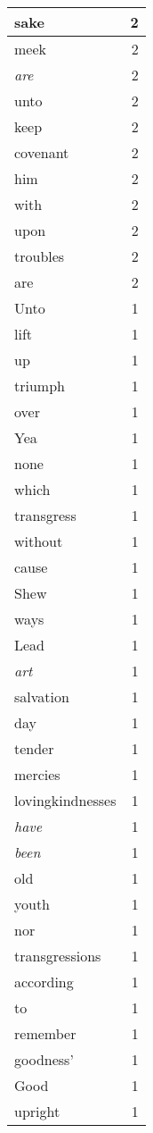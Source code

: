 \begin{center}
\begin{longtable}{l|r}
sake & 2 \\ \hline
meek & 2 \\ \hline
\emph{are} & 2 \\ \hline
unto & 2 \\ \hline
keep & 2 \\ \hline
covenant & 2 \\ \hline
him & 2 \\ \hline
with & 2 \\ \hline
upon & 2 \\ \hline
troubles & 2 \\ \hline
are & 2 \\ \hline
Unto & 1 \\ \hline
lift & 1 \\ \hline
up & 1 \\ \hline
triumph & 1 \\ \hline
over & 1 \\ \hline
Yea & 1 \\ \hline
none & 1 \\ \hline
which & 1 \\ \hline
transgress & 1 \\ \hline
without & 1 \\ \hline
cause & 1 \\ \hline
Shew & 1 \\ \hline
ways & 1 \\ \hline
Lead & 1 \\ \hline
\emph{art} & 1 \\ \hline
salvation & 1 \\ \hline
day & 1 \\ \hline
tender & 1 \\ \hline
mercies & 1 \\ \hline
lovingkindnesses & 1 \\ \hline
\emph{have} & 1 \\ \hline
\emph{been} & 1 \\ \hline
old & 1 \\ \hline
youth & 1 \\ \hline
nor & 1 \\ \hline
transgressions & 1 \\ \hline
according & 1 \\ \hline
to & 1 \\ \hline
remember & 1 \\ \hline
goodness' & 1 \\ \hline
Good & 1 \\ \hline
upright & 1 \\ \hline

\end{longtable}
\end{center}
